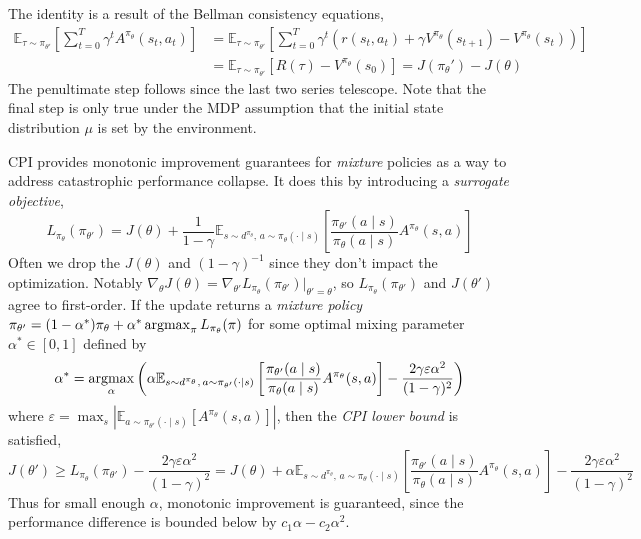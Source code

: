 \documentclass[11pt, letterpaper]{article}
\begin{document}
\begin{remark}
    The identity is a result of the Bellman consistency equations,
    \begin{align*}
        \mathbb{E}_{\tau \sim \pi_{\theta'}} \left[ \sum_{t=0}^T \gamma^t A^{\pi_\theta}(s_t, a_t) \right]
        &= \mathbb{E}_{\tau \sim \pi_{\theta'}} \left[ \sum_{t=0}^T \gamma^t (r(s_t, a_t) + \gamma V^{\pi_\theta}(s_{t+1}) - V^{\pi_\theta}(s_t)) \right] \\
        &= \mathbb{E}_{\tau \sim \pi_{\theta'}} [R(\tau) - V^{\pi_\theta}(s_0)]
        = J(\pi_\theta') - J(\theta)
    \end{align*}
    The penultimate step follows since the last two series telescope. Note that the final step is only true under the MDP assumption that the initial state distribution \(\mu\) is set by the environment. 
\end{remark}

\begin{concept}
    CPI provides monotonic improvement guarantees for \textit{mixture} policies as a way to address catastrophic performance collapse. It does this by introducing a \textit{surrogate objective}, 
    \[
        L_{\pi_\theta}(\pi_{\theta'}) 
        = J(\theta) + \frac{1}{1 - \gamma} \mathbb{E}_{s \sim d^{\pi_\theta},\, a \sim \pi_\theta(\cdot \mid s)} \left[ \frac{\pi_{\theta'}(a \mid s)}{\pi_\theta(a \mid s)} A^{\pi_\theta}(s, a) \right]
    \]
    Often we drop the \(J(\theta)\) and \((1 - \gamma)^{-1}\) since they don't impact the optimization. Notably \(\nabla_\theta J(\theta) = \nabla_{\theta'} L_{\pi_\theta}(\pi_{\theta'}) \rvert_{\theta' = \theta}\), so \(L_{\pi_\theta}(\pi_{\theta'})\) and \(J(\theta')\) agree to first-order. If the update returns a \textit{mixture policy} \(\pi_{\theta'} = (1 - \alpha^*) \pi_\theta + \alpha^* \operatorname*{argmax}_{\pi} L_{\pi_\theta}(\pi)\) for some optimal mixing parameter \(\alpha^* \in [0,1]\) defined by 
    \[
        \alpha^* = \operatorname*{argmax}_\alpha \left( \alpha \mathbb{E}_{s \sim d^{\pi_\theta},\, a \sim \pi_{\theta'}(\cdot \mid s)}\left[\frac{\pi_{\theta'}(a \mid s)}{\pi_\theta(a \mid s)} A^{\pi_\theta}(s, a)\right] - \frac{2\gamma\varepsilon\alpha^2}{(1 - \gamma)^2} \right)
    \]
    where \(\varepsilon = \max_s |\mathbb{E}_{a \sim \pi_{\theta'}(\cdot \mid s)} [A^{\pi_\theta}(s, a)]|\), then the \textit{CPI lower bound} is satisfied, 
    \[
        J(\theta') \geq L_{\pi_\theta}(\pi_{\theta'}) - \frac{2\gamma\varepsilon\alpha^2}{(1 - \gamma)^2}
        = J(\theta) + \alpha \mathbb{E}_{s \sim d^{\pi_\theta},\, a \sim \pi_\theta(\cdot \mid s)}\left[ \frac{\pi_{\theta'}(a \mid s)}{\pi_\theta(a \mid s)} A^{\pi_\theta}(s, a)\right] - \frac{2\gamma\varepsilon\alpha^2}{(1 - \gamma)^2}
    \]
    Thus for small enough \(\alpha\), monotonic improvement is guaranteed, since the performance difference is bounded below by \(c_1 \alpha - c_2 \alpha^2\). 
\end{concept}
\end{document}
